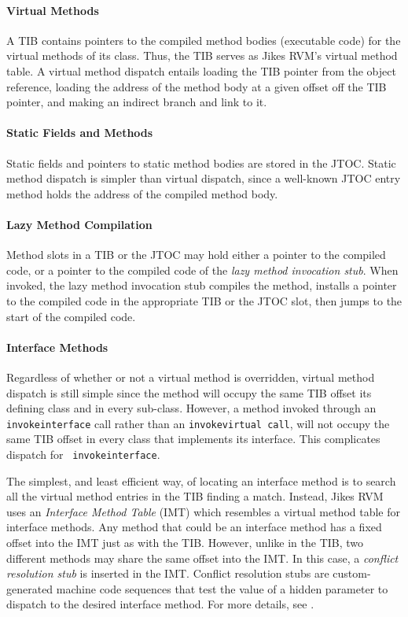 \paragraph{Virtual Methods}
A TIB contains pointers to the compiled method 
bodies (executable code) for the virtual methods of its class. 
Thus, the TIB serves as Jikes RVM's virtual method table.
A virtual method dispatch entails loading the TIB pointer from 
the object reference, loading the address of the method
body at a given offset off the TIB pointer, and making an indirect
branch and link to it.

\paragraph{Static Fields and Methods} 
Static fields and pointers to static method bodies are stored in the JTOC. 
Static method dispatch is simpler than virtual dispatch, since 
a well-known JTOC entry method holds the address of the compiled method
body. 

\paragraph{Lazy Method Compilation}
Method slots in a TIB or the JTOC may hold either
a pointer to the compiled code, 
or a pointer to the compiled code of the {\em lazy method invocation stub}.
When invoked, the lazy method invocation stub compiles the 
method, installs a pointer to the compiled code in the appropriate
TIB or the JTOC slot, then 
jumps to the start of the compiled code. 

\paragraph{Interface Methods}
Regardless of whether or not a virtual method is overridden,
virtual method dispatch is still simple since the method will occupy 
the same TIB offset its defining class and in every sub-class.
However, a method invoked through an {\tt invokeinterface} call rather than
an {\tt invokevirtual call}, will not occupy the same TIB offset in every class that 
implements its interface.  This complicates dispatch for {\tt
invokeinterface}.

The simplest, and least efficient way, of locating an interface method 
is to search all the virtual method entries in the TIB finding a match.
Instead, Jikes RVM uses an {\em Interface Method Table} (IMT) which resembles
a virtual method table for interface methods. Any method that could be an interface method has 
a fixed offset into the IMT just as with the TIB. However, unlike in the TIB, two different methods may
share the same offset into the IMT. In this case, a {\em conflict resolution
stub} is inserted in the IMT. Conflict resolution stubs are
custom-generated machine code sequences that test the value of a
hidden parameter to dispatch to the desired interface method.
For more details, see
.

